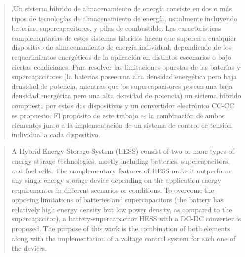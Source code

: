 \newenvironment{abstractpage}
  {\cleardoublepage\vspace*{\fill}\thispagestyle{empty}}
  {\vfill\cleardoublepage}
\renewenvironment{abstract}[1]
  {\bigskip%
   \begin{center}\bfseries\abstractname\end{center}}
  {\par\bigskip}

\begin{abstractpage}
\begin{abstract}
    .Un sistema híbrido de almacenamiento de energía consiste en dos o más tipos de tecnologías de almacenamiento de energía, usualmente incluyendo baterías, supercapacitores, y pilas de combustible. Las características complementarias de estos sistemas híbridos hacen que superen a cualquier dispositivo de almacenamiento de energía individual, dependiendo de los requerimientos energéticos de la aplicación en distintos escenarios o bajo ciertas condiciones. Para resolver las limitaciones opuestas de las baterías y supercapacitores (la baterías posee una alta densidad energética pero baja densidad de potencia, mientras que los supercapacitores poseen una baja densidad energética pero una alta densidad de potencia) un sistema híbrido compuesto por estos dos dispositivos y un convertidor electrónico CC-CC es propuesto. El propósito de este trabajo es la combinación de ambos elementos junto a la implementación de un sistema de control de tensión individual a cada dispositivo. 
\end{abstract}

\renewcommand{\abstractname}{Abstract}

\begin{abstract}
    A Hybrid Energy Storage System (HESS) consist of two or more types of energy storage technologies, mostly including batteries, supercapacitors, and fuel cells. The complementary features of HESS make it outperform any single energy storage device depending on the application energy requirementes in different scenarios or conditions. To overcome the opposing limitations of batteries and supercapacitors (the battery has relatively high energy density but low power density, as compared to the supercapacitor), a battery-supercapacitor HESS with a DC-DC converter is proposed. The purpose of this work is the combination  of both elements along with the implementation of a voltage control system for each one of the devices.
\end{abstract}
\end{abstractpage}